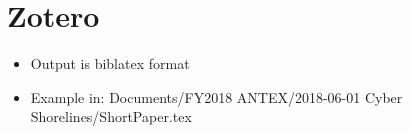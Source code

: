 \documentclass[
]{md2pdf}
\providecommand{\tightlist}{%
  \setlength{\itemsep}{0pt}\setlength{\parskip}{0pt}}
\begin{document}
\hypertarget{zotero}{%
\section{Zotero}\label{zotero}}

\begin{itemize}
\tightlist
\item
  Output is biblatex format
\item
  Example in: Documents/FY2018 ANTEX/2018-06-01 Cyber
  Shorelines/ShortPaper.tex
\end{itemize}
\end{document}
